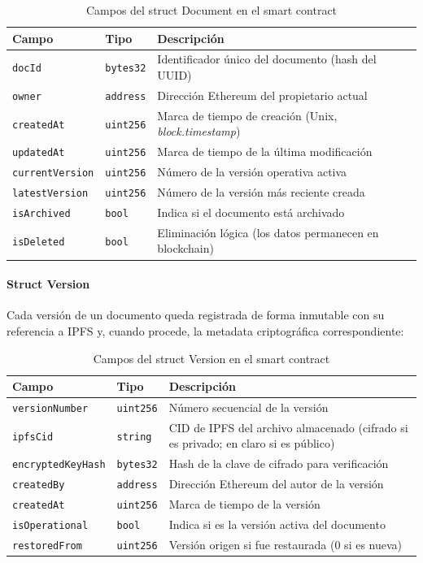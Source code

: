 \documentclass[11pt, a4paper]{article}
\begin{document}
\begin{table}[H]
\centering
\begin{tabular}{|l|l|p{7cm}|}
\hline
\textbf{Campo} & \textbf{Tipo} & \textbf{Descripción} \\
\hline
\texttt{docId} & \texttt{bytes32} & Identificador único del documento (hash del UUID) \\
\hline
\texttt{owner} & \texttt{address} & Dirección Ethereum del propietario actual \\
\hline
\texttt{createdAt} & \texttt{uint256} & Marca de tiempo de creación (Unix, \textit{block.timestamp}) \\
\hline
\texttt{updatedAt} & \texttt{uint256} & Marca de tiempo de la última modificación \\
\hline
\texttt{currentVersion} & \texttt{uint256} & Número de la versión operativa activa \\
\hline
\texttt{latestVersion} & \texttt{uint256} & Número de la versión más reciente creada \\
\hline
\texttt{isArchived} & \texttt{bool} & Indica si el documento está archivado \\
\hline
\texttt{isDeleted} & \texttt{bool} & Eliminación lógica (los datos permanecen en blockchain) \\
\hline
\end{tabular}
\caption{Campos del struct Document en el smart contract}
\end{table}

\paragraph{Struct Version}

Cada versión de un documento queda registrada de forma inmutable con su referencia a IPFS y, cuando procede, la metadata criptográfica correspondiente:

\begin{table}[H]
\centering
\begin{tabular}{|l|l|p{7cm}|}
\hline
\textbf{Campo} & \textbf{Tipo} & \textbf{Descripción} \\
\hline
\texttt{versionNumber} & \texttt{uint256} & Número secuencial de la versión \\
\hline
\texttt{ipfsCid} & \texttt{string} & CID de IPFS del archivo almacenado (cifrado si es privado; en claro si es público) \\
\hline
\texttt{encryptedKeyHash} & \texttt{bytes32} & Hash de la clave de cifrado para verificación \\
\hline
\texttt{createdBy} & \texttt{address} & Dirección Ethereum del autor de la versión \\
\hline
\texttt{createdAt} & \texttt{uint256} & Marca de tiempo de la versión \\
\hline
\texttt{isOperational} & \texttt{bool} & Indica si es la versión activa del documento \\
\hline
\texttt{restoredFrom} & \texttt{uint256} & Versión origen si fue restaurada (0 si es nueva) \\
\hline
\end{tabular}
\caption{Campos del struct Version en el smart contract}
\end{table}
\end{document}
